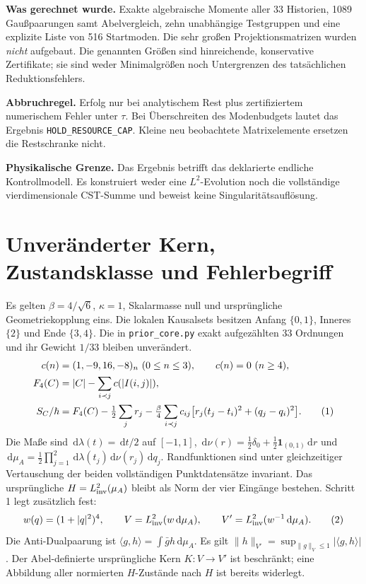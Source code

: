 \documentclass[10pt,a4paper]{article}
\newcommand{\dd}{\,\mathrm d}\newcommand{\ii}{\mathrm i}\newcommand{\R}{\mathbb R}
\newcommand{\one}{\mathbf1}\newcommand{\norm}[1]{\lVert#1\rVert}
\begin{document}
\textbf{Was gerechnet wurde.} Exakte algebraische Momente aller 33 Historien,
1089 Gaußpaarungen samt Abelvergleich, zehn unabhängige Testgruppen und eine
explizite Liste von 516 Startmoden. Die sehr großen Projektionsmatrizen wurden
\emph{nicht} aufgebaut. Die genannten Größen sind hinreichende, konservative
Zertifikate; sie sind weder Minimalgrößen noch Untergrenzen des tatsächlichen
Reduktionsfehlers.

\textbf{Abbruchregel.} Erfolg nur bei analytischem Rest plus zertifiziertem
numerischem Fehler unter $\tau$. Bei Überschreiten des Modenbudgets lautet das
Ergebnis \texttt{HOLD\_RESOURCE\_CAP}. Kleine neu beobachtete Matrixelemente
ersetzen die Restschranke nicht.

\textbf{Physikalische Grenze.} Das Ergebnis betrifft das deklarierte endliche
Kontrollmodell. Es konstruiert weder eine $L^2$-Evolution noch die vollständige
vierdimensionale CST-Summe und beweist keine Singularitätsauflösung.
\newpage

\section{Unveränderter Kern, Zustandsklasse und Fehlerbegriff}
Es gelten $\beta=4/\sqrt6$, $\kappa=1$, Skalarmasse null und ursprüngliche
Geometriekopplung eins. Die lokalen Kausalsets besitzen Anfang $\{0,1\}$,
Inneres $\{2\}$ und Ende $\{3,4\}$. Die in \texttt{prior\_core.py} exakt
aufgezählten 33 Ordnungen und ihr Gewicht $1/33$ bleiben unverändert.
\begin{align}
 c(n)&=(1,-9,16,-8)_n\ (0\le n\le3),\qquad c(n)=0\ (n\ge4),\notag\\
 F_4(C)&=|C|-\sum_{i\prec j}c(|I(i,j)|),\notag\\
 S_C/\hbar&=F_4(C)-\tfrac12\sum_j r_j
 -\tfrac\beta4\sum_{i\prec j}c_{ij}
 \bigl[r_j(t_j-t_i)^2+(q_j-q_i)^2\bigr].                 \tag{1}
\end{align}
Die Maße sind $\dd\lambda(t)=\dd t/2$ auf $[-1,1]$,
$\dd\nu(r)=\tfrac12\delta_0+\tfrac12\one_{(0,1)}\dd r$ und
$\dd\mu_A=\tfrac12\prod_{j=1}^2\dd\lambda(t_j)\dd\nu(r_j)\dd q_j$.
Randfunktionen sind unter gleichzeitiger Vertauschung der beiden vollständigen
Punktdatensätze invariant. Das ursprüngliche $H=L^2_{\rm inv}(\mu_A)$ bleibt
als Norm der vier Eingänge bestehen. Schritt 1 legt zusätzlich fest:
\[
 w(q)=(1+|q|^2)^4,\qquad V=L^2_{\rm inv}(w\dd\mu_A),\qquad
 V'=L^2_{\rm inv}(w^{-1}\dd\mu_A).                         \tag{2}
\]
Die Anti-Dualpaarung ist $\langle g,h\rangle=\int\bar g h\dd\mu_A$.
Es gilt $\norm{h}_{V'}=\sup_{\norm{g}_V\le1}|\langle g,h\rangle|$.
Der Abel-definierte ursprüngliche Kern $K:V\to V'$ ist beschränkt; eine
Abbildung aller normierten $H$-Zustände nach $H$ ist bereits widerlegt.
\end{document}
